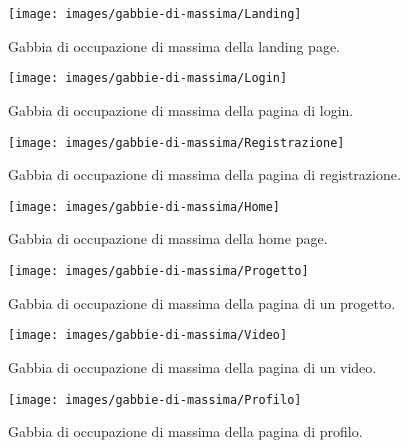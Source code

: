 
\begin{figure}[H]
	\centering
	\caption{Gabbia di occupazione di massima della landing page.}
	\label{fig:gabbie-massima:landing-page}
	\texttt{[image: images/gabbie-di-massima/Landing]}
\end{figure}

\begin{figure}[H]
	\centering
	\caption{Gabbia di occupazione di massima della pagina di login.}
	\label{fig:gabbie-massima:login}
	\texttt{[image: images/gabbie-di-massima/Login]}
\end{figure}
\begin{figure}[H]
	\centering

	\caption{Gabbia di occupazione di massima della pagina di registrazione.}
	\label{fig:gabbie-massima:registrazione}
	\texttt{[image: images/gabbie-di-massima/Registrazione]}
\end{figure}

\begin{figure}[H]
	\centering
	\caption{Gabbia di occupazione di massima della home page.}
	\label{fig:gabbie-massima:home-page}
	\texttt{[image: images/gabbie-di-massima/Home]}
\end{figure}

\begin{figure}[H]
	\centering
	\caption{Gabbia di occupazione di massima della pagina di un progetto.}
	\label{fig:gabbie-massima:project}
	\texttt{[image: images/gabbie-di-massima/Progetto]}
\end{figure}

\begin{figure}[H]
	\centering
	\caption{Gabbia di occupazione di massima della pagina di un video.}
	\label{fig:gabbie-massima:video}
	\texttt{[image: images/gabbie-di-massima/Video]}
\end{figure}

\begin{figure}[H]
	\centering
	\caption{Gabbia di occupazione di massima della pagina di profilo.}
	\label{fig:gabbie-massima:profilo}
	\texttt{[image: images/gabbie-di-massima/Profilo]}
\end{figure}

